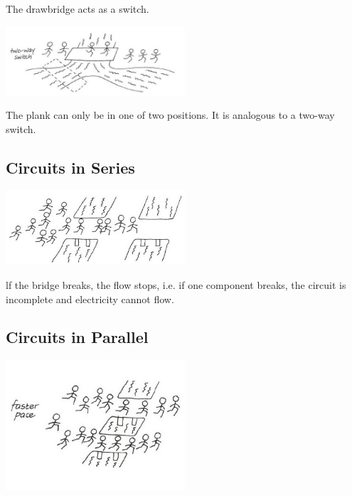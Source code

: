 \begin{multicols}{2}
The drawbridge acts as a switch.

\begin{center}
\includegraphics[width=0.5\textwidth]{./img/vso/analogy-switch-2.jpg}
\end{center}

The plank can only be in one of
two positions. It is analogous to a
two-way switch.


\subsection*{Circuits in Series}

\begin{center}
\includegraphics[width=0.5\textwidth]{./img/vso/analogy-series.jpg}
\end{center}

lf the bridge breaks, the flow stops, i.e. if one component breaks, the
circuit is incomplete and electricity cannot flow.

\vfill
\columnbreak

\subsection*{Circuits in Parallel}

\begin{center}
\includegraphics[width=0.5\textwidth]{./img/vso/analogy-parallel.jpg}
\end{center}


\end{multicols}
